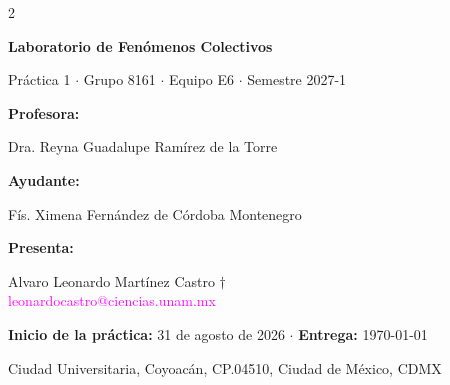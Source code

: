 \documentclass[12pt]{article}
\begin{document}
\normalsize
\vspace{0.3 cm}
\begin{tcolorbox}[colframe=white, colback=gray!10!white]
\begin{multicols}{2}
    \raggedright
    \textbf{Laboratorio de Fenómenos Colectivos}
    
    \vspace{0.1 cm}
    Práctica 1 $\cdot$ Grupo 8161 $\cdot$ Equipo E6 $\cdot$ Semestre 2027-1
    \normalsize

    \vspace{0.2 cm}
    \textbf{Profesora:}

    \vspace{0.1 cm}
    Dra. Reyna Guadalupe Ramírez de la Torre
    \normalsize

    \vspace{0.2 cm}
    \textbf{Ayudante:}

    \vspace{0.1 cm}
    Fís. Ximena Fernández de Córdoba Montenegro
    \normalsize

    \columnbreak

    \raggedleft
    \textbf{Presenta:}

    \vspace{-0.2 cm}
    \noindent{\color{teal}\rule{0.9\linewidth}{0.5mm}}

    \normalsize
    \vspace{0.1 cm}
    Alvaro Leonardo Martínez Castro $\dagger$ \\
    \footnotesize
    \textcolor{magenta}{leonardocastro@ciencias.unam.mx}\makebox[0.5cm][l]{}


\end{multicols}

\centering
\textbf{Inicio de la práctica:} 31 de agosto de 2026 \qquad $\cdot$ \qquad \textbf{Entrega:} \today

\vspace{-0.2 cm}
\noindent{\color{pumazul}\rule{\linewidth}{0.5mm}}

\centering
\vspace{0.1 cm}
\footnotesize
Ciudad Universitaria, Coyoacán, CP.04510, Ciudad de México, CDMX
\end{tcolorbox}
\end{document}

